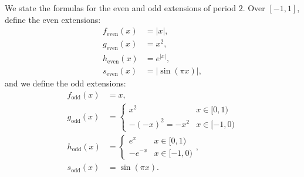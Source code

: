 \documentclass[11pt]{article}
\begin{document}
\begin{solution}
\begin{center}
\begin{tabular}{cc}
        \end{tabular}
    \end{center}
    We state the formulas for the even and odd extensions of period $2$.
    Over \([-1,1]\), define the even extensions:
    \begin{align*}
        f_{\text{even}}(x) &= |x|, 
        \\
        g_{\text{even}}(x) &= x^2,
        \\
        h_{\text{even}}(x) &= e^{|x|}, 
        \\
        s_{\text{even}}(x) &= |\sin(\pi x)|,
    \end{align*}
    and we define the odd extensions:
    \begin{align*}
        f_{\text{odd}}(x) &= x, 
        \\
        g_{\text{odd}}(x) &= \begin{cases}
        x^2 & x \in [0,1) \\
        -(-x)^2 = -x^2 & x \in [-1,0)
        \end{cases}
        \\
        h_{\text{odd}}(x) &= \begin{cases}
        e^x & x \in [0,1) \\
        -e^{-x} & x \in [-1,0)
        \end{cases}, 
        \\
        s_{\text{odd}}(x) &= \sin(\pi x).
    \end{align*}
\end{solution}
\end{document}
